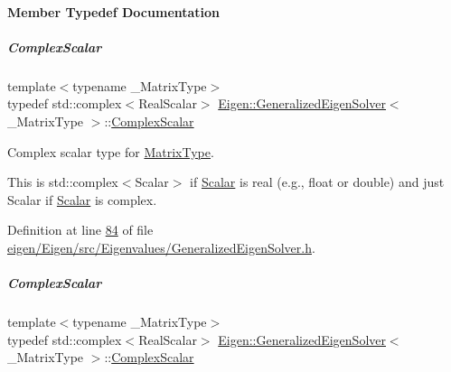 \paragraph{Member Typedef Documentation}
\mbox{\label{group___eigenvalues___module_abdec07af91db1345bb4c74066e3d0ea7}} 
\subparagraph{\texorpdfstring{Complex\+Scalar}{ComplexScalar}\hspace{0.1cm}{\footnotesize\ttfamily [1/2]}}
{\footnotesize\ttfamily template$<$typename \+\_\+\+Matrix\+Type$>$ \\
typedef std\+::complex$<$Real\+Scalar$>$ \hyperlink{group___eigenvalues___module_class_eigen_1_1_generalized_eigen_solver}{Eigen\+::\+Generalized\+Eigen\+Solver}$<$ \+\_\+\+Matrix\+Type $>$\+::\hyperlink{group___eigenvalues___module_abdec07af91db1345bb4c74066e3d0ea7}{Complex\+Scalar}}



Complex scalar type for \hyperlink{group___eigenvalues___module_a56f4b9823bb9a267de3aaf48428cd247}{Matrix\+Type}. 

This is {\ttfamily std\+::complex$<$\+Scalar$>$} if \hyperlink{group___eigenvalues___module_afb318d0b097ff8dd5a7410d31317ca47}{Scalar} is real (e.\+g., {\ttfamily float} or {\ttfamily double}) and just {\ttfamily Scalar} if \hyperlink{group___eigenvalues___module_afb318d0b097ff8dd5a7410d31317ca47}{Scalar} is complex. 

Definition at line \hyperlink{eigen_2_eigen_2src_2_eigenvalues_2_generalized_eigen_solver_8h_source_l00084}{84} of file \hyperlink{eigen_2_eigen_2src_2_eigenvalues_2_generalized_eigen_solver_8h_source}{eigen/\+Eigen/src/\+Eigenvalues/\+Generalized\+Eigen\+Solver.\+h}.

\mbox{\label{group___eigenvalues___module_abdec07af91db1345bb4c74066e3d0ea7}} 
\subparagraph{\texorpdfstring{Complex\+Scalar}{ComplexScalar}\hspace{0.1cm}{\footnotesize\ttfamily [2/2]}}
{\footnotesize\ttfamily template$<$typename \+\_\+\+Matrix\+Type$>$ \\
typedef std\+::complex$<$Real\+Scalar$>$ \hyperlink{group___eigenvalues___module_class_eigen_1_1_generalized_eigen_solver}{Eigen\+::\+Generalized\+Eigen\+Solver}$<$ \+\_\+\+Matrix\+Type $>$\+::\hyperlink{group___eigenvalues___module_abdec07af91db1345bb4c74066e3d0ea7}{Complex\+Scalar}}



